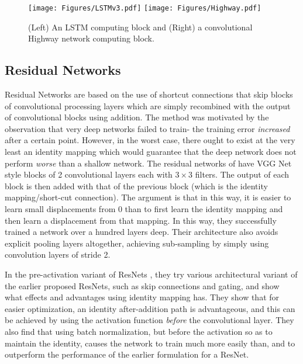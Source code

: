 \documentclass{article}
\begin{document}
\begin{figure}[htbp]
  \centering
    \texttt{[image: Figures/LSTMv3.pdf]} \hspace{.2cm}
     \texttt{[image: Figures/Highway.pdf]}
  \caption[The CRMN architecture]{(Left) An LSTM computing block and (Right) a convolutional Highway network computing block.}
  \label{fig:lstmHighway}
\end{figure}


\subsection{Residual Networks}

Residual Networks\cite{he2015deep} are based on the use of shortcut connections that skip blocks of convolutional processing layers which are simply recombined with the output of convolutional blocks using addition. The method was motivated by the observation that very deep networks failed to train- the training error \emph{increased} after a certain point. However, in the worst case, there ought to exist at the very least an identity mapping which would guarantee that the deep network does not perform \emph{worse} than a shallow network. The residual networks of \cite{he2015deep} have VGG Net style blocks of 2 convolutional layers each with \(3\times3\) filters. The output of each block is then added with that of the previous block (which is the identity mapping/short-cut connection). The argument is that in this way, it is easier to learn small displacements from 0 than to first learn the identity mapping and then learn a displacement from that mapping. In this way, they successfully trained a network over a hundred layers deep. Their architecture also avoids explicit pooling layers altogether, achieving sub-sampling by simply using convolution layers of stride 2.


In the pre-activation variant of ResNets \cite{he2016identity}, they try various architectural variant of the earlier proposed ResNets, such as skip connections and gating, and show what effects and advantages using identity mapping has. They show that for easier optimization, an identity after-addition path is advantageous, and this can be achieved by using the activation function \emph{before} the convolutional layer. They also find that using batch normalization, but before the activation so as to maintain the identity, causes the network to train much more easily than, and to outperform the performance of the earlier formulation for a ResNet.
\end{document}
